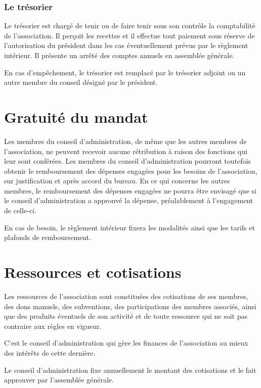 \documentclass[a4wide,12pt]{scrartcl}
\begin{document}
\subsubsection*{Le trésorier}

Le trésorier est chargé de tenir ou de faire tenir sous son contrôle
la comptabilité de l'association. Il perçoit les recettes et il
effectue tout paiement sous réserve de l'autorisation du président
dans les cas éventuellement prévus par le règlement intérieur. Il
présente un arrêté des comptes annuels en assemblée générale.

En cas d'empêchement, le trésorier est remplacé par le trésorier
adjoint ou un autre membre du conseil désigné par le président.

\section{Gratuité du mandat}

Les membres du conseil d'administration, de même que les autres
membres de l'association, ne peuvent recevoir aucune rétribution à
raison des fonctions qui leur sont conférées. Les membres du conseil
d'administration pourront toutefois obtenir le remboursement des
dépenses engagées pour les besoins de l'association, sur justification
et après accord du bureau. En ce qui concerne les autres membres, le
remboursement des dépenses engagées ne pourra être envisagé que si le
conseil d'administration a approuvé la dépense, préalablement à
l'engagement de celle-ci.

En cas de besoin, le règlement intérieur fixera les modalités ainsi
que les tarifs et plafonds de remboursement.
 
\section{Ressources et cotisations}

Les ressources de l'association sont constituées des cotisations de
ses membres, des dons manuels, des subventions, des participations des
membres associés, ainsi que des produits éventuels de son activité et
de toute ressource qui ne soit pas contraire aux règles en vigueur.

C'est le conseil d'administration qui gère les finances de
l'association au mieux des intérêts de cette dernière.

Le conseil d'administration fixe annuellement le montant des
cotisations et le fait approuver par l'assemblée générale.
\end{document}
